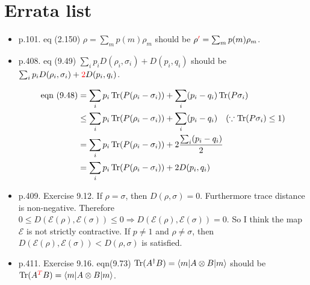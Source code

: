\chapter{Errata list}\label{errata}

\begin{itemize}
    \item p.101. eq (2.150) $\rho = \sum_m p(m) \rho_m$ should be $\rho \textcolor{red}{'} = \sum_m p(m) \rho_m$.
%
    \item p.408. eq (9.49) $\sum_i p_i D(\rho_i, \sigma_i) + D(p_i, q_i)$ should be $\sum_i p_i D(\rho_i, \sigma_i) + \textcolor[rgb]{1,0,0}{2}D(p_i, q_i)$.

    \begin{align*}
    \text{eqn } (9.48) &= \sum_i p_i \operatorname{Tr} (P(\rho_i - \sigma_i)) + \sum_i (p_i - q_i) \operatorname{Tr} (P \sigma_i)\\
    &\leq \sum_i p_i \operatorname{Tr} (P(\rho_i - \sigma_i)) + \sum_i (p_i - q_i)~~~(\because \operatorname{Tr} (P \sigma_i) \leq 1)\\
    &= \sum_i p_i \operatorname{Tr} (P(\rho_i - \sigma_i)) + 2 \frac{\sum_i (p_i - q_i)}{2}\\
    &= \sum_i p_i \operatorname{Tr} (P(\rho_i - \sigma_i)) + 2D(p_i, q_i)
    \end{align*}
%
    \item p.409. Exercise 9.12. If $\rho = \sigma$, then $D(\rho, \sigma) = 0$. Furthermore trace distance is non-negative. Therefore $0 \leq D(\mathcal{E}(\rho), \mathcal{E}(\sigma)) \leq 0 \Rightarrow D(\mathcal{E}(\rho), \mathcal{E}(\sigma))  = 0$. So I think the map $\mathcal{E}$ is not strictly contractive. If $p \neq 1$ and $\rho \neq \sigma$, then $D(\mathcal{E}(\rho), \mathcal{E}(\sigma)) < D(\rho, \sigma)$ is satisfied.
%
    \item p.411. Exercise 9.16. eqn(9.73) $\operatorname{Tr} (A^\dagger B) = \braket{m | A \otimes B | m}$ should be $\operatorname{Tr} (A^{\textcolor{red}{T}} B) = \braket{m | A \otimes B | m}$.


\end{itemize}
